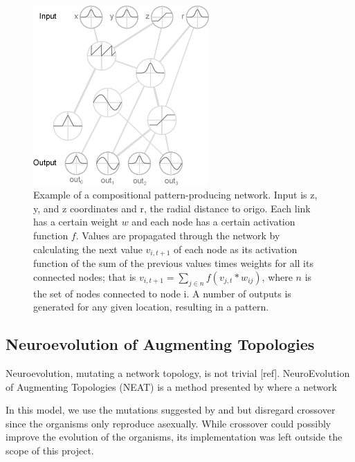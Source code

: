 \begin{figure}[H]
  \centering
  \includegraphics[width=0.6\textwidth]{figure/CPPN}
  \caption{Example of a compositional pattern-producing network. Input is z, y, and z coordinates and r, the radial distance to origo. Each link has a certain weight \(w\) and each node has a certain activation function \(f\). Values are propagated through the network by calculating the next value \(v_{i,t+1}\) of each node as its activation function of the sum of the previous values times weights for all its connected nodes; that is \(v_{i,t+1}=\sum_{j\in n}f(v_{j,t}*w_{ij})\), where \(n\) is the set of nodes connected to node i. A number of outputs is generated for any given location, resulting in a pattern.} \label{fig:cppn} 
\end{figure}

\subsection{Neuroevolution of Augmenting
Topologies} \label{subsec:NEAT}
Neuroevolution, mutating a network topology, is not trivial [ref].  NeuroEvolution of Augmenting Topologies (NEAT) is a method presented by \cite{stanley2002evolving} where a network

In this model, we use the mutations suggested by \cite{stanley2002evolving} and \cite{stanley2007compositional} but disregard crossover since the organisms only reproduce asexually. While crossover could possibly improve the evolution of the organisms, its implementation was left outside the scope of this project.


